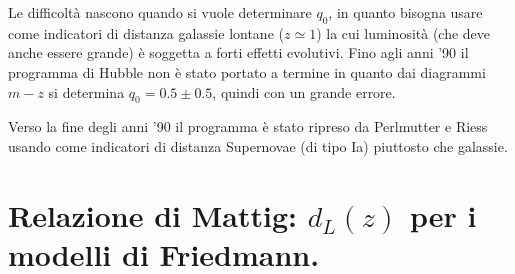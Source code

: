 Le difficoltà nascono quando si vuole determinare $q_0$, in quanto bisogna usare
come indicatori di distanza galassie lontane ($z \simeq 1$) la cui luminosità
(che deve anche essere grande) è soggetta a forti effetti evolutivi.  Fino agli
anni '90 il programma di Hubble non è stato portato a termine in quanto dai
diagrammi $m-z$ si determina $q_0 = 0.5 \pm 0.5$, quindi con un grande errore.

Verso la fine degli anni '90 il programma è stato ripreso da Perlmutter e Riess
usando come indicatori di distanza Supernovae (di tipo Ia) piuttosto che
galassie.

\section{Relazione di Mattig: $d_L(z)$ per i modelli di Friedmann. }

